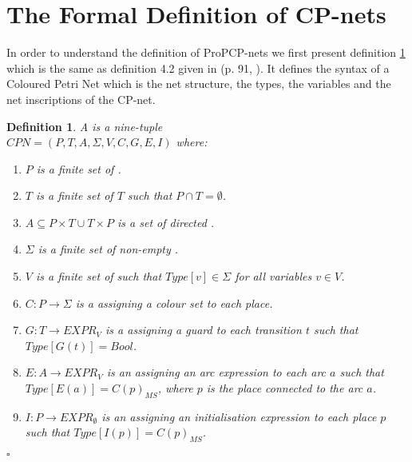 \section{The Formal Definition of CP-nets}
\label{sec:cpnformal}
In order to understand the definition of ProPCP-nets we first present definition \ref{def:cpnet} which is the same as definition 4.2 given in (p. 91, \cite{RefWorks:87}). It defines the syntax of a Coloured Petri Net which is the net structure, the types, the variables and the net inscriptions of the CP-net.

\newtheorem{definition}{Definition}
\begin{definition}
\label{def:cpnet}
A  is a nine-tuple \\ $\mathit{CPN} =
(P,T,A,\Sigma,V,C,G,E,I)$ where:

\begin{enumerate}

\item $P$ is a finite set of .

\item $T$ is a finite set of  $T$ such that $P \cap T = \emptyset$.

\item $A \subseteq P \times T \cup T \times P$ is a set of directed .

\item $\Sigma$ is a finite set of non-empty . 

\item $V$ is a finite set of  such that $\mathit{Type}[v] \in \Sigma$ for all variables $v \in V$.

\item $C : P \rightarrow \Sigma$ is a  assigning a colour set to each place.

\item $G : T \rightarrow \mathit{EXPR}_V$ is a  
assigning a guard to each transition $t$ such that $\mathit{Type}[G(t)] = \mathit{Bool}$.

\item $E : A \rightarrow \mathit{EXPR}_V$ is an  assigning an arc expression to each arc $a$ such that $\mathit{Type}[E(a)] = C(p)_{MS}$, where $p$ is the place connected to the arc $a$.

\item $I : P \rightarrow \mathit{EXPR}_{\emptyset}$ is an
 assigning an initialisation
expression to each place $p$ such that $\mathit{Type}[I(p)] =
C(p)_{MS}$.

\end{enumerate}
\flushright $\square$
\end{definition}

